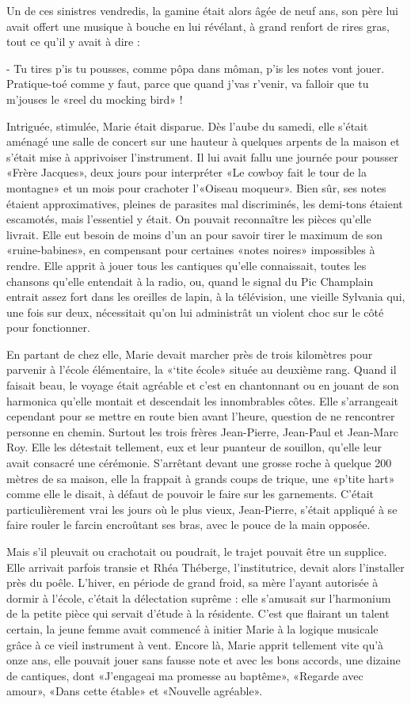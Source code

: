 Un de ces sinistres vendredis, la gamine était alors âgée de neuf ans, son père lui avait offert une musique à bouche en lui révélant, à grand renfort de rires gras, tout ce qu’il y avait à dire :

- Tu tires p’is tu pousses, comme pôpa dans môman, p’is les notes vont jouer. Pratique-toé comme y faut, parce que quand j’vas r’venir, va falloir que tu m’jouses le «reel du mocking bird» !

Intriguée, stimulée, Marie était disparue. Dès l’aube du samedi, elle s’était aménagé une salle de concert sur une hauteur à quelques arpents de la maison et s’était mise à apprivoiser l’instrument. Il lui avait fallu une journée pour pousser «Frère Jacques», deux jours pour interpréter «Le cowboy fait le tour de la montagne» et un mois pour crachoter l’«Oiseau moqueur». Bien sûr, ses notes étaient approximatives, pleines de parasites mal discriminés, les demi-tons étaient escamotés, mais l’essentiel y était. On pouvait reconnaître les pièces qu’elle livrait. Elle eut besoin de moins d’un an pour savoir tirer le maximum de son «ruine-babines», en compensant pour certaines «notes noires» impossibles à rendre. Elle apprit à jouer tous les cantiques qu’elle connaissait, toutes les chansons qu’elle entendait à la radio, ou, quand le signal du Pic Champlain entrait assez fort dans les oreilles de lapin, à la télévision, une vieille Sylvania qui, une fois sur deux, nécessitait qu’on lui administrât un violent choc sur le côté pour fonctionner.

En partant de chez elle, Marie devait marcher près de trois kilomètres pour parvenir à l’école élémentaire, la «‘tite école» située au deuxième rang. Quand il faisait beau, le voyage était agréable et c’est en chantonnant ou en jouant de son harmonica qu’elle montait et descendait les innombrables côtes. Elle s’arrangeait cependant pour se mettre en route bien avant l’heure, question de ne rencontrer personne en chemin. Surtout les trois frères Jean-Pierre, Jean-Paul et Jean-Marc Roy. Elle les détestait tellement, eux et leur puanteur de souillon, qu’elle leur avait consacré une cérémonie. S’arrêtant devant une grosse roche à quelque 200 mètres de sa maison, elle la frappait à grands coups de trique, une «p’tite hart» comme elle le disait, à défaut de pouvoir le faire sur les garnements. C’était particulièrement vrai les jours où le plus vieux, Jean-Pierre, s’était appliqué à se faire rouler le farcin encroûtant ses bras, avec le pouce de la main opposée.

Mais s’il pleuvait ou crachotait ou poudrait, le trajet pouvait être un supplice. Elle arrivait parfois transie et Rhéa Théberge, l’institutrice, devait alors l’installer près du poêle. L’hiver, en période de grand froid, sa mère l’ayant autorisée à dormir à l’école, c’était la délectation suprême : elle s’amusait sur l’harmonium de la petite pièce qui servait d’étude à la résidente. C’est que flairant un talent certain, la jeune femme avait commencé à initier Marie à la logique musicale grâce à ce vieil instrument à vent. Encore là, Marie apprit tellement vite qu’à onze ans, elle pouvait jouer sans fausse note et avec les bons accords, une dizaine de cantiques, dont «J’engageai ma promesse au baptême», «Regarde avec amour», «Dans cette étable» et «Nouvelle agréable».

